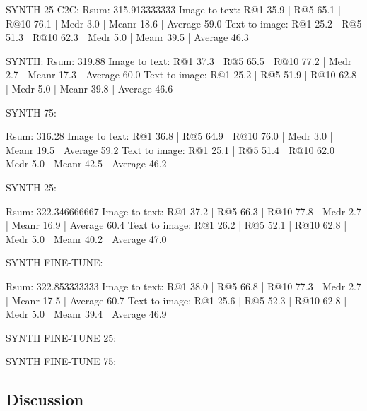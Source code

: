 SYNTH 25 C2C:
Rsum: 315.913333333
Image to text: R@1 35.9 | R@5 65.1 | R@10 76.1 | Medr 3.0 | Meanr 18.6 | Average 59.0
Text to image: R@1 25.2 | R@5 51.3 | R@10 62.3 | Medr 5.0 | Meanr 39.5 | Average 46.3

SYNTH:
Rsum: 319.88
Image to text: R@1 37.3 | R@5 65.5 | R@10 77.2 | Medr 2.7 | Meanr 17.3 | Average 60.0
Text to image: R@1 25.2 | R@5 51.9 | R@10 62.8 | Medr 5.0 | Meanr 39.8 | Average 46.6

SYNTH 75:

Rsum: 316.28
Image to text: R@1 36.8 | R@5 64.9 | R@10 76.0 | Medr 3.0 | Meanr 19.5 | Average 59.2
Text to image: R@1 25.1 | R@5 51.4 | R@10 62.0 | Medr 5.0 | Meanr 42.5 | Average 46.2

SYNTH 25:

Rsum: 322.346666667
Image to text: R@1 37.2 | R@5 66.3 | R@10 77.8 | Medr 2.7 | Meanr 16.9 | Average 60.4
Text to image: R@1 26.2 | R@5 52.1 | R@10 62.8 | Medr 5.0 | Meanr 40.2 | Average 47.0


SYNTH FINE-TUNE:

Rsum: 322.853333333
Image to text: R@1 38.0 | R@5 66.8 | R@10 77.3 | Medr 2.7 | Meanr 17.5 | Average 60.7
Text to image: R@1 25.6 | R@5 52.3 | R@10 62.8 | Medr 5.0 | Meanr 39.4 | Average 46.9


SYNTH FINE-TUNE 25:

SYNTH FINE-TUNE 75:

\subsection{Discussion}

